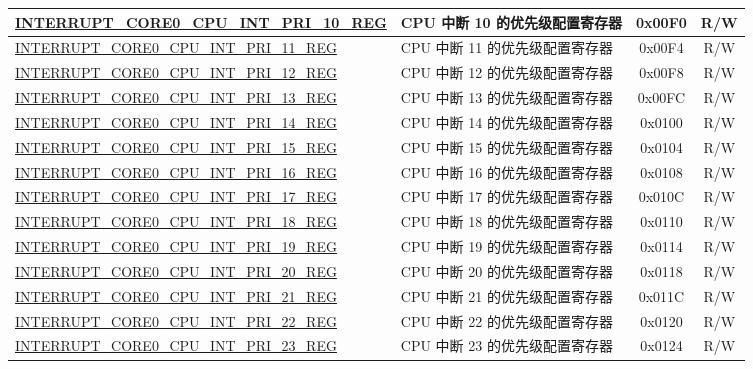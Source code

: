 \begin{longtable}{ | p{8.0cm} | p{6.4cm} | c | c| }
\hyperref[regdesc:INTERRUPTCORE0CPUINTPRI0REG]{INTERRUPT\_CORE0\_CPU\_INT\_PRI\_10\_REG} & CPU 中断 10 的优先级配置寄存器 & 0x00F0 & R/W \\ \hline
\hyperref[regdesc:INTERRUPTCORE0CPUINTPRI0REG]{INTERRUPT\_CORE0\_CPU\_INT\_PRI\_11\_REG} & CPU 中断 11 的优先级配置寄存器 & 0x00F4 & R/W \\ \hline
\hyperref[regdesc:INTERRUPTCORE0CPUINTPRI0REG]{INTERRUPT\_CORE0\_CPU\_INT\_PRI\_12\_REG} & CPU 中断 12 的优先级配置寄存器 & 0x00F8 & R/W \\ \hline
\hyperref[regdesc:INTERRUPTCORE0CPUINTPRI0REG]{INTERRUPT\_CORE0\_CPU\_INT\_PRI\_13\_REG} & CPU 中断 13 的优先级配置寄存器 & 0x00FC & R/W \\ \hline
\hyperref[regdesc:INTERRUPTCORE0CPUINTPRI0REG]{INTERRUPT\_CORE0\_CPU\_INT\_PRI\_14\_REG} & CPU 中断 14 的优先级配置寄存器 & 0x0100 & R/W \\ \hline
\hyperref[regdesc:INTERRUPTCORE0CPUINTPRI0REG]{INTERRUPT\_CORE0\_CPU\_INT\_PRI\_15\_REG} & CPU 中断 15 的优先级配置寄存器 & 0x0104 & R/W \\ \hline
\hyperref[regdesc:INTERRUPTCORE0CPUINTPRI0REG]{INTERRUPT\_CORE0\_CPU\_INT\_PRI\_16\_REG} & CPU 中断 16 的优先级配置寄存器 & 0x0108 & R/W \\ \hline
\hyperref[regdesc:INTERRUPTCORE0CPUINTPRI0REG]{INTERRUPT\_CORE0\_CPU\_INT\_PRI\_17\_REG} & CPU 中断 17 的优先级配置寄存器 & 0x010C & R/W \\ \hline
\hyperref[regdesc:INTERRUPTCORE0CPUINTPRI0REG]{INTERRUPT\_CORE0\_CPU\_INT\_PRI\_18\_REG} & CPU 中断 18 的优先级配置寄存器 & 0x0110 & R/W \\ \hline
\hyperref[regdesc:INTERRUPTCORE0CPUINTPRI0REG]{INTERRUPT\_CORE0\_CPU\_INT\_PRI\_19\_REG} & CPU 中断 19 的优先级配置寄存器 & 0x0114 & R/W \\ \hline
\hyperref[regdesc:INTERRUPTCORE0CPUINTPRI0REG]{INTERRUPT\_CORE0\_CPU\_INT\_PRI\_20\_REG} & CPU 中断 20 的优先级配置寄存器 & 0x0118 & R/W \\ \hline
\hyperref[regdesc:INTERRUPTCORE0CPUINTPRI0REG]{INTERRUPT\_CORE0\_CPU\_INT\_PRI\_21\_REG} & CPU 中断 21 的优先级配置寄存器 & 0x011C & R/W \\ \hline
\hyperref[regdesc:INTERRUPTCORE0CPUINTPRI0REG]{INTERRUPT\_CORE0\_CPU\_INT\_PRI\_22\_REG} & CPU 中断 22 的优先级配置寄存器 & 0x0120 & R/W \\ \hline
\hyperref[regdesc:INTERRUPTCORE0CPUINTPRI0REG]{INTERRUPT\_CORE0\_CPU\_INT\_PRI\_23\_REG} & CPU 中断 23 的优先级配置寄存器 & 0x0124 & R/W \\ \hline

\end{longtable}
